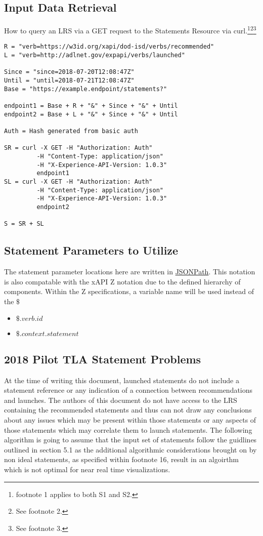 \documentclass{article}
\begin{document}
\subsection{Input Data Retrieval}
How to query an LRS via a GET request to the Statements Resource via
curl.\footnote{\label{refMoreLink2} footnote 1 applies to both S1
  and S2.}\footnote{\label{refnoZ2} See footnote
  2.}\footnote{\label{refallTime2} See footnote 3.}

\begin{lstlisting}[frame=single]
R = "verb=https://w3id.org/xapi/dod-isd/verbs/recommended"
L = "verb=http://adlnet.gov/expapi/verbs/launched"

Since = "since=2018-07-20T12:08:47Z"
Until = "until=2018-07-21T12:08:47Z"
Base = "https://example.endpoint/statements?"

endpoint1 = Base + R + "&" + Since + "&" + Until
endpoint2 = Base + L + "&" + Since + "&" + Until

Auth = Hash generated from basic auth

SR = curl -X GET -H "Authorization: Auth"
         -H "Content-Type: application/json"
         -H "X-Experience-API-Version: 1.0.3"
         endpoint1
SL = curl -X GET -H "Authorization: Auth"
         -H "Content-Type: application/json"
         -H "X-Experience-API-Version: 1.0.3"
         endpoint2

S = SR + SL
\end{lstlisting}

\subsection{Statement Parameters to Utilize}
The statement parameter locations here are written in
\href{http://goessner.net/articles/JsonPath/}{JSONPath}. This notation
is also compatable with the xAPI Z notation due to the defined
hierarchy of components. Within the Z specifications, a variable name
will be used instead of the $\$$
\begin{itemize}
\item $\$.verb.id$
\item $\$.context.statement$
\end{itemize}

\subsection{2018 Pilot TLA Statement Problems}
At the time of writing this document, launched statements do not
include a statement reference or any indication of a connection
between recommendations and launches. The authors of this document do
not have access to the LRS containing the recommended statements and
thus can not draw any conclusions about any issues which may be
present within those statements or any aspects of those statements
which may correlate them to launch statements. The following algorithm
is going to assume that the input set of statements follow the
guidlines outlined in section 5.1 as the additional algorithmic
considerations brought on by non ideal statements, as specified within
footnote 16, result in an algoirthm which is not optimal for near real
time visualizations.
\end{document}
